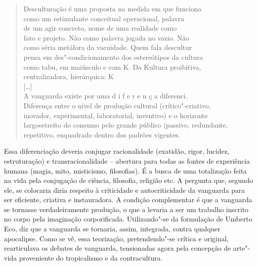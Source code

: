 \begin{quote}
Desculturação é uma proposta na medida em que \qb{}funciona\\
como um estimulante conceitual operacional, palavra\\
de um agir concreto, nome de uma realidade como\\
fato e projeto. Não como palavra jogada no vazio. Não\\
como séria metáfora da vacuidade. Quem fala \qb{}descultur\\
pensa em des"-condicionamento dos estereótipos da cultura\\
como tabu, em maiúsculo e com K. Da Kultura proibitiva,\\
centralizadora, hierárquica: K\\
{[}\ldots{}{]}\\
A vanguarda existe por uma d i f e r e n ç a \qb{}diferenci.\\
Diferença entre o nível de produção cultural \qb{}(crítico"-criativo,\\
inovador, experimental, laboratorial, inventivo) e o \qb{}horizonte\\
largoestreito do consumo pelo grande público (passivo, \qb{}redundante,\\
repetitivo, enquadrado dentro dos padrões vigentes.
\end{quote}

Essa diferenciação deveria conjugar racionalidade (exatidão, rigor,
lucidez, estruturação) e transracionalidade -- abertura para todas as
fontes de experiência humana (magia, mito, misticismo, filosofias). É a
busca de uma totalização feita na vida pela conjugação de ciência,
filosofia, religião etc. A pergunta que, segundo ele, se colocaria diria
respeito à criticidade e autocriticidade da vanguarda para ser
eficiente, criativa e instauradora. A condição complementar é que a
vanguarda se tornasse verdadeiramente produção, o que a levaria a ser um
trabalho inscrito no corpo pela imaginação corporificada. Utilizando"-se
da formulação de Umberto Eco, diz que a vanguarda se tornaria, assim,
integrada, contra qualquer apocalipse. Como se vê, essa teorização,
pretendendo"-se crítica e original, rearticulava os debates de
vanguarda, tensionadas agora pela concepção de arte"-vida proveniente do
tropicalismo e da contracultura.

